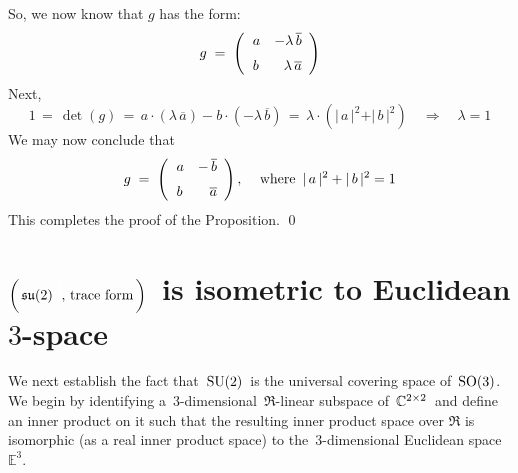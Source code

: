 So, we now know that $g$ has the form:
\begin{equation*}
g
\; = \;
	\left(\begin{array}{rr}
		a & -\lambda\,\overline{b}
		\\
		\overset{{\color{white}-}}{b} & \lambda\,\overline{a}
		\end{array}\right)
\end{equation*}
Next,
\begin{equation*}
1
\,=\, \det(g)
\,=\, a\cdot(\lambda\,\overline{a}) - b \cdot (-\lambda\,\overline{b})
\,=\, \lambda\cdot(\vert\,a\,\vert^{2} + \vert\,b\,\vert^{2})
\quad\Longrightarrow\quad
	\lambda = 1
\end{equation*}
We may now conclude that
\begin{equation*}
g
\; = \;
	\left(\begin{array}{rr}
		a & -\,\overline{b}
		\\
		\overset{{\color{white}-}}{b} & \overline{a}
		\end{array}\right),\,
\quad
\textnormal{where \,$\vert\,a\,\vert^{2} + \vert\,b\,\vert^{2} = 1$}
\end{equation*}
This completes the proof of the Proposition.
\qed


\vskip 1.0cm
\section{$\left(\,\su(2){\color{white}\textnormal{\huge1}}\!\!,\,\textnormal{trace form}\,\right)$\, is isometric to Euclidean $3$-space}


We next establish the fact that \,$\textnormal{SU}(2)$\, is the universal covering space of \,$\textnormal{SO}(3)$.\,
We begin by identifying a \,$3$-dimensional \,$\Re$-linear subspace of \,$\mathbb{C}^{2 \times 2}$\,
and define an inner product on it such that the resulting inner product space over $\Re$
is isomorphic (as a real inner product space) to the \,$3$-dimensional Euclidean space \,$\mathbb{E}^{3}$.

